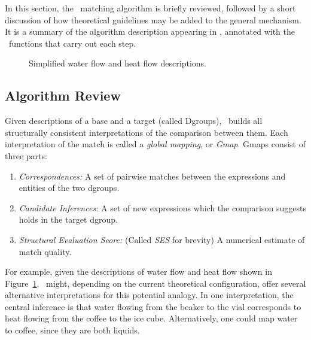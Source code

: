 In this section, the \SME\ matching algorithm is briefly reviewed, followed
by a short discussion of how theoretical guidelines may be added to the
general mechanism. It is a summary of the algorithm description appearing in
\cite{sme-aij}, annotated with the \SME\ functions that carry out each step.


\begin{figure}
\border
\vspace{2.1in}
\caption{Simplified water flow and heat flow descriptions.}
\label{fg:wfhf-calculus}
\border
\end{figure}


\subsection{Algorithm Review}

Given descriptions of a base and a target (called Dgroups), \SME\ builds all
structurally consistent interpretations of the comparison between them.
Each interpretation of the match is called a {\em global mapping}, or {\em
Gmap}.  Gmaps consist of three parts:

\begin{enumerate}
\item{\em Correspondences:} A set of pairwise matches between the
expressions and entities of the two dgroups.
\item {\em Candidate Inferences:} A set of new expressions which the
comparison suggests holds in the target dgroup.
\item {\em Structural Evaluation Score:} (Called {\em SES} for
brevity) A numerical estimate of match quality.
\end{enumerate}

For example, given the descriptions of water flow and heat flow shown in
Figure~\ref{fg:wfhf-calculus}, \SME\ might, depending on the current
theoretical configuration, offer several alternative interpretations for
this potential analogy.  In one interpretation, the central inference is
that water flowing from the beaker to the vial corresponds to heat flowing
from the coffee to the ice cube. Alternatively, one could map water to
coffee, since they are both liquids.


